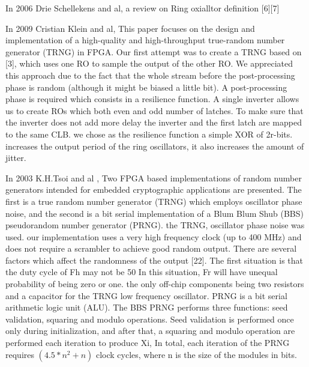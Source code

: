In 2006 Drie Schellekens and al, a review on Ring oxialltor definition [6][7]

In 2009 Cristian Klein and al, This paper focuses on the design and implementation of a high-quality and high-throughput true-random number generator (TRNG) in FPGA. Our first attempt was to create a TRNG based on [3], which uses one RO to sample the output of the other RO. We appreciated this approach due to the fact that the whole stream before the post-processing phase is random (although it might be biased a little bit). A post-processing phase is required which consists in a resilience function. A single inverter allows us to create ROs which both even and odd number of latches. To make sure that the inverter does not add more delay the inverter and the first latch are mapped to the same CLB. we chose as the resilience function a simple XOR of 2r-bits. increases the output period of the ring oscillators, it also increases the amount of jitter.

In 2003 K.H.Tsoi and al , Two FPGA based implementations of random number generators intended for embedded cryptographic applications are presented. The first is a true random number generator (TRNG) which employs oscillator phase noise, and the second is a bit serial implementation of a Blum Blum Shub (BBS) pseudorandom number generator (PRNG). the TRNG, oscillator phase noise was used. our implementation uses a very high frequency clock (up to 400 MHz) and does not require a scrambler to achieve good random output. There are several factors which affect the randomness of the output [22]. The first situation is that the duty cycle of Fh may not be 50%
In this situation, Fr will have unequal probability of being zero or one. the only off-chip components being two resistors and a capacitor for the TRNG low frequency oscillator. PRNG is a bit serial arithmetic logic unit (ALU). The BBS PRNG performs three functions: seed validation, squaring and modulo operations. Seed validation is
performed once only during initialization, and after that, a squaring and modulo operation are performed each iteration to produce Xi, In total, each iteration of the PRNG requires $(4.5*n^{2} + n)$ clock cycles, where n is the size of the modules in bits.

